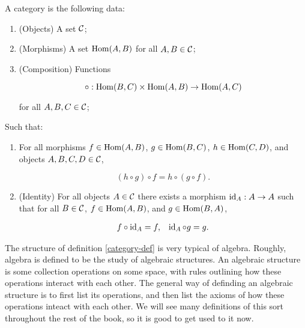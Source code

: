 \begin{defn}[Category]\label{category-def} A category is the following data:

\begin{enumerate}
\item (Objects) A set ${\mathcal C}$;
\item (Morphisms) A set $\operatorname{Hom}(A,B)$ for all $A,B\in {\mathcal C}$;
\item (Composition) Functions

$$\circ: \operatorname{Hom}(B,C)\times \operatorname{Hom}(A,B)\to \operatorname{Hom}(A,C)$$

for all $A,B,C\in {\mathcal C}$;
\end{enumerate}

Such that:

\begin{enumerate}

\item  For all morphisms $f\in \operatorname{Hom}(A,B)$, $g\in \operatorname{Hom}(B,C)$, $h\in\operatorname{Hom}(C,D)$,  and objects $A,B,C,D\in {\mathcal C}$,

$$(h\circ g)\circ f = h\circ (g\circ f).$$

\item (Identity) For all objects $A\in {\mathcal C}$ there exists a morphism $\operatorname{id}_{A}: A\to A$ such that for all $B\in {\mathcal C}$, $f\in \operatorname{Hom}(A,B)$, and $g\in \operatorname{Hom}(B,A)$,

\begin{align*}
f\circ \operatorname{id}_{A}=f, && \operatorname{id}_{A}\circ g = g.
\end{align*}

\end{enumerate}
\end{defn}

\begin{rem} The structure of definition \ref{category-def} is very typical of algebra. Roughly, algebra is defined to be the study of algebraic structures. An algebraic structure is some collection operations on some space, with rules outlining how these operations interact with each other. The general way of definding an algebraic structure is to first list its operations, and then list the axioms of how these operations inteact with each other. We will see many definitions of this sort throughout the rest of the book, so it is good to get used to it now.
\end{rem}

